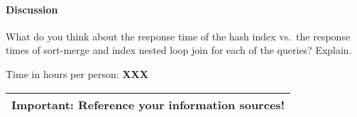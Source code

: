 \documentclass[11pt]{scrartcl}
\begin{document}
\paragraph{Discussion}

What do you think about the response time of the hash index vs.\ the
response times of sort-merge and index nested loop join for each of
the queries? Explain.

\bigskip

\noindent Time in hours per person: {\bf XXX}

\bigskip

\begin{center}
  \begin{tabular}{c}
    \hline
    {\bf Important:} Reference your information sources!
    \\\hline
  \end{tabular}
\end{center}
\end{document}
